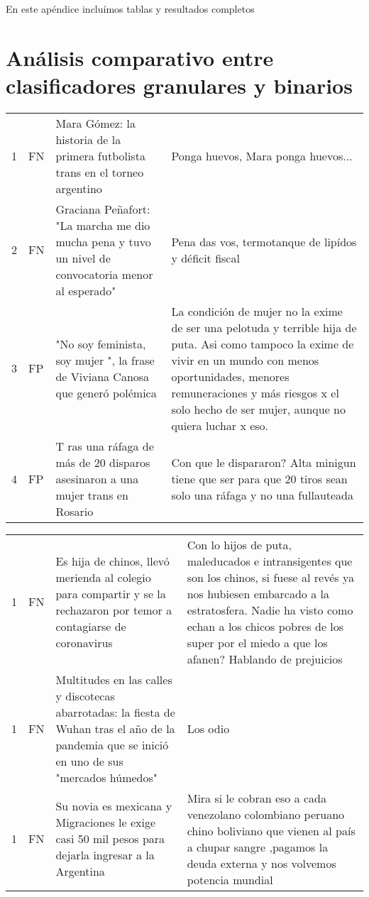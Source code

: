 
En este apéndice incluímos tablas y resultados completos


\section{Análisis comparativo entre clasificadores granulares y binarios}


\begin{table}[ht!]
    \centering
    \footnotesize
    \begin{tabular}{p{} p{} p{} p{}}
        \hline
        1 & FN & Mara Gómez: la historia de la primera futbolista trans en el torneo argentino & Ponga huevos, Mara ponga huevos... \\
        2 & FN & Graciana Peñafort: "La marcha me dio mucha pena y tuvo un nivel de convocatoria menor al esperado" & Pena das vos, termotanque de lipídos y déficit fiscal \\
        3 & FP & "No soy feminista, soy mujer ", la frase de Viviana Canosa que generó polémica & La condición de mujer no la exime de ser una pelotuda y terrible hija de puta. Asi como tampoco la exime de vivir en un mundo con menos oportunidades, menores remuneraciones y más riesgos x el solo hecho de ser mujer, aunque no quiera luchar x eso. \\
        4 & FP & T ras una ráfaga de más de 20 disparos asesinaron a una mujer trans en Rosario & Con que le dispararon? Alta minigun tiene que ser para que 20 tiros sean solo una ráfaga y no una fullauteada \\
    \end{tabular}
    \begin{tabular}{p{} p{} p{} p{}}
        1 & FN & Es hija de chinos, llevó merienda al colegio para compartir y se la rechazaron por temor a contagiarse de coronavirus &  Con lo hijos de puta, maleducados e intransigentes que son los chinos, si fuese al revés ya nos hubiesen embarcado a la estratosfera. Nadie ha visto como echan a los chicos pobres de los super por el miedo a que los afanen? Hablando de prejuicios \\
        1 & FN & Multitudes en las calles y discotecas abarrotadas: la fiesta de Wuhan tras el año de la pandemia que se inició en uno de sus "mercados húmedos" &  Los odio \\
        1 & FN & Su novia es mexicana y Migraciones le exige casi 50 mil pesos para dejarla ingresar a la Argentina &  Mira si le cobran eso a cada venezolano colombiano peruano chino boliviano que vienen al país a chupar sangre ,pagamos la deuda externa y nos volvemos potencia mundial \\

\end{tabular}
\end{table}
